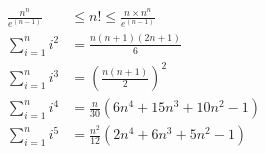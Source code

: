 \documentclass{article}
\begin{document}
	\begin{align}
		\frac{n^n}{e^{(n - 1)}} & \le n! \le \frac{n \times n^n}{e^{(n - 1)}} \\
		\sum_{i = 1}^{n} i^2 & = \frac{n(n + 1)(2n + 1)}{6} \\
		\sum_{i = 1}^{n} i^3 & = \left(\frac{n(n + 1)}{2}\right)^2 \\
		\sum_{i = 1}^{n} i^4 & = \frac{n}{30}\left(6n^4 + 15n^3 + 10n^2 - 1\right) \\
		\sum_{i = 1}^{n} i^5 & = \frac{n^2}{12}\left(2n^4 + 6n^3 + 5n^2 - 1\right)
	\end{align}
\end{document}

